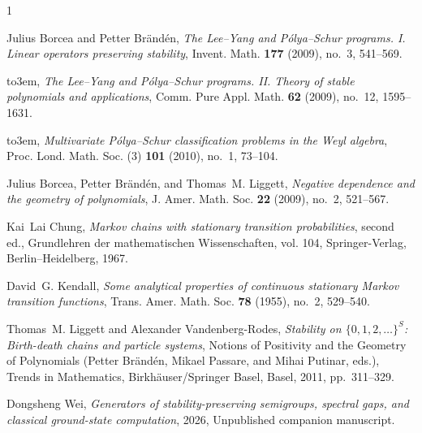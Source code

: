 \documentclass[reqno]{amsart}
\theoremstyle{definition}
\theoremstyle{remark}
\begin{document}
\makeatletter{}\makeatother
\providecommand{\bysame}{\leavevmode\hbox to3em{\hrulefill}\thinspace}
\providecommand{\MR}{\relax\ifhmode\unskip\space\fi MR }
\providecommand{\MRhref}[2]{%
  \href{http://www.ams.org/mathscinet-getitem?mr=#1}{#2}
}
\providecommand{\href}[2]{#2}
\begin{thebibliography}{1}

Julius Borcea and Petter Br{\"a}nd{\'e}n, \emph{The {Lee--Yang} and
  {P{\'o}lya--Schur} programs. {I}. {Linear} operators preserving stability},
  Invent. Math. \textbf{177} (2009), no.~3, 541--569.

\bysame, \emph{The {Lee--Yang} and {P{\'o}lya--Schur} programs. {II}. {Theory}
  of stable polynomials and applications}, Comm. Pure Appl. Math. \textbf{62}
  (2009), no.~12, 1595--1631.

\bysame, \emph{Multivariate {P{\'o}lya--Schur} classification problems in the
  {Weyl} algebra}, Proc. Lond. Math. Soc. (3) \textbf{101} (2010), no.~1,
  73--104.

Julius Borcea, Petter Br{\"a}nd{\'e}n, and Thomas~M. Liggett, \emph{Negative
  dependence and the geometry of polynomials}, J. Amer. Math. Soc. \textbf{22}
  (2009), no.~2, 521--567.

Kai~Lai Chung, \emph{Markov chains with stationary transition probabilities},
  second ed., Grundlehren der mathematischen Wissenschaften, vol. 104,
  Springer-Verlag, Berlin--Heidelberg, 1967.

David~G. Kendall, \emph{Some analytical properties of continuous stationary
  {Markov} transition functions}, Trans. Amer. Math. Soc. \textbf{78} (1955),
  no.~2, 529--540.

Thomas~M. Liggett and Alexander Vandenberg-Rodes, \emph{Stability on
  {$\{0,1,2,\ldots\}^{S}$}: Birth-death chains and particle systems}, Notions
  of Positivity and the Geometry of Polynomials (Petter Br{\"a}nd{\'e}n, Mikael
  Passare, and Mihai Putinar, eds.), Trends in Mathematics,
  Birkh{\"a}user/Springer Basel, Basel, 2011, pp.~311--329.

Dongsheng Wei, \emph{Generators of stability-preserving semigroups, spectral
  gaps, and classical ground-state computation}, 2026, Unpublished companion
  manuscript.

\end{thebibliography}
\end{document}

